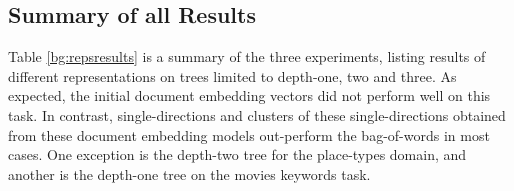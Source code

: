 
	





\subsection{Summary of all Results}\label{ch3:resultssummary}

Table \ref{bg:repsresults} is a summary of the three experiments, listing results of different representations on trees limited to depth-one, two and three. As expected, the initial  document embedding vectors did not perform well on this task. In contrast, single-directions and clusters of these single-directions obtained from these document embedding models out-perform the bag-of-words in most cases. One exception is the depth-two tree for the place-types domain, and another is the depth-one tree on the movies keywords task. 

